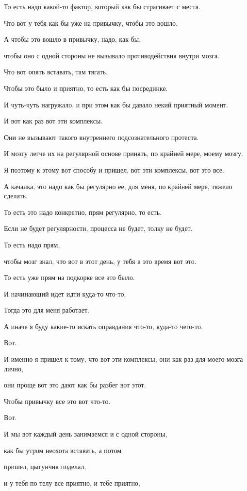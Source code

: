 То есть надо какой-то фактор, который как бы страгивает с места.

Что вот у тебя как бы уже на привычку, чтобы это вошло.

А чтобы это вошло в привычку, надо, как бы,

чтобы оно с одной стороны не вызывало противодействия внутри мозга.

Что вот опять вставать, там тягать.

Чтобы это было и приятно, то есть как бы посрединке.

И чуть-чуть нагружало, и при этом как бы давало некий приятный момент.

И вот как раз вот эти комплексы.

Они не вызывают такого внутреннего подсознательного протеста.

И мозгу легче их на регулярной основе принять, по крайней мере, моему мозгу.

Я поэтому к этому вот способу и пришел, вот эти комплексы, вот это все.

А качалка, это надо как бы регулярно ее, для меня, по крайней мере, тяжело сделать.

То есть это надо конкретно, прям регулярно, то есть.

Если не будет регулярности, процесса не будет, толку не будет.

То есть надо прям,

чтобы мозг знал, что вот в этот день, у тебя в это время вот это.

То есть уже прям на подкорке все это было.

И начинающий идет идти куда-то что-то.

Тогда это для меня работает.

А иначе я буду какие-то искать оправдания что-то, куда-то чего-то.

Вот.

И именно я пришел к тому, что вот эти комплексы, они как раз для моего мозга лично,

они проще вот это дают как бы разбег вот этот.

Чтобы привычку все это вот что-то.

Вот.

И мы вот каждый день занимаемся и с одной стороны,

как бы утром неохота вставать, а потом

пришел, цыгунчик поделал,

и у тебя по телу все приятно, и тебе приятно,

